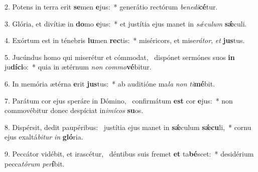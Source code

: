 2. Potens in terra erit \textbf{se}men \textbf{e}jus:~*  generátio rectórum \textit{be}\textit{ne}\textit{di}\textbf{cé}tur.\

3. Glória, et divítiæ in \textbf{do}mo \textbf{e}jus:~*  et justítia ejus manet in \textit{sǽ}\textit{cu}\textit{lum} \textbf{sǽ}culi.\

4. Exórtum est in ténebris \textbf{lu}men \textbf{rec}tis:~*  miséricors, et mise\textit{rá}\textit{tor}, \textit{et} \textbf{jus}tus.\

5. Jucúndus homo qui miserétur et cómmodat, \dag\  dispónet sermónes suos \textbf{in} ju\textbf{dí}\textbf{ci}o:~*  quia in ætérnum \textit{non} \textit{com}\textit{mo}\textbf{vé}bitur.\

6. In memória ætérna \textbf{e}rit \textbf{jus}tus:~*  ab auditióne ma\textit{la} \textit{non} \textit{ti}\textbf{mé}bit.\

7. Parátum cor ejus speráre in Dómino, \dag\  confirmátum \textbf{est} cor \textbf{e}jus:~*  non commovébitur donec despíciat in\textit{i}\textit{mí}\textit{cos} \textbf{su}os.\

8. Dispérsit, dedit paupéribus: \dag\  justítia ejus manet in \textbf{sǽ}culum \textbf{sǽ}\textbf{cu}li,~*  cornu ejus exaltá\textit{bi}\textit{tur} \textit{in} \textbf{gló}ria.\

9. Peccátor vidébit, et irascétur, \dag\  déntibus suis fremet \textbf{et} ta\textbf{bé}scet:~*  desidérium pecca\textit{tó}\textit{rum} \textit{per}\textbf{í}bit.\

